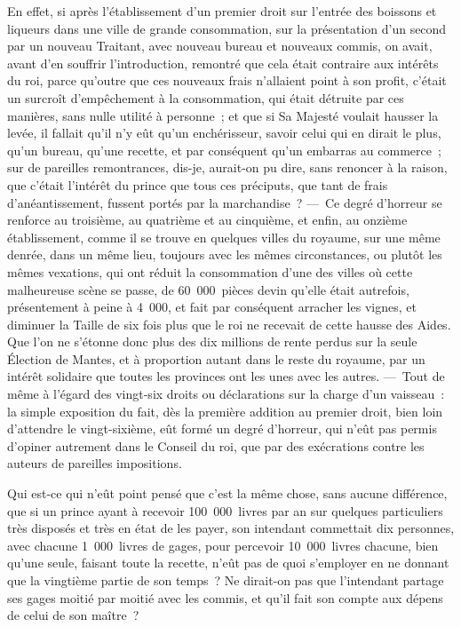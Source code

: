 \documentclass[french,twoside]{book} %
\begin{document}
En effet, si après l’établissement d’un premier droit sur l’entrée des boissons et liqueurs dans une ville de grande consommation, sur la présentation d’un second par un nouveau Traitant, avec nouveau bureau et nouveaux commis, on avait, avant d’en souffrir l’introduction, remontré que cela était contraire aux intérêts du roi, parce qu’outre que ces nouveaux frais n’allaient point à son profit, c’était un surcroît d’empêchement à la consommation, qui était détruite par ces manières, sans nulle utilité à personne ; et que si Sa Majesté voulait hausser la levée, il fallait qu’il n’y eût qu’un enchérisseur, savoir celui qui en dirait le plus, qu’un bureau, qu’une recette, et par conséquent qu’un embarras au commerce ; sur de pareilles remontrances, dis-je, aurait-on pu dire, sans renoncer à la raison, que c’était l’intérêt du prince que tous ces préciputs, que tant de frais d’anéantissement, fussent portés par la marchandise ? — Ce degré d’horreur se renforce au troisième, au quatrième et au cinquième, et enfin, au onzième établissement, comme il se trouve en quelques villes du royaume, sur une même denrée, dans un même lieu, toujours avec les mêmes circonstances, ou plutôt les mêmes vexations, qui ont réduit la consommation d’une des villes où cette malheureuse scène se passe, de 60 000 pièces devin qu’elle était autrefois, présentement à peine à 4 000, et fait par conséquent arracher les vignes, et diminuer la Taille de six fois plus que le roi ne recevait de cette hausse des Aides. Que l’on ne s’étonne donc plus des dix millions de rente perdus sur la seule Élection de Mantes, et à proportion autant dans le reste du royaume, par un intérêt solidaire que toutes les provinces ont les unes avec les autres. — Tout de même à l’égard des vingt-six droits ou déclarations sur la charge d’un vaisseau : la simple exposition du fait, dès la première addition au premier droit, bien loin d’attendre le vingt-sixième, eût formé un degré d’horreur, qui n’eût pas permis d’opiner autrement dans le Conseil du roi, que par des exécrations contre les auteurs de pareilles impositions.\par
Qui est-ce qui n’eût point pensé que c’est la même chose, sans aucune différence, que si un prince ayant à recevoir 100 000 livres par an sur quelques particuliers très disposés et très en état de les payer, son intendant commettait dix personnes, avec chacune 1 000 livres de gages, pour percevoir 10 000 livres chacune, bien qu’une seule, faisant toute la recette, n’eût pas de quoi s’employer en ne donnant que la vingtième partie de son temps ? Ne dirait-on pas que l’intendant partage ses gages moitié par moitié avec les commis, et qu’il fait son compte aux dépens de celui de son maître ?\par
\end{document}
